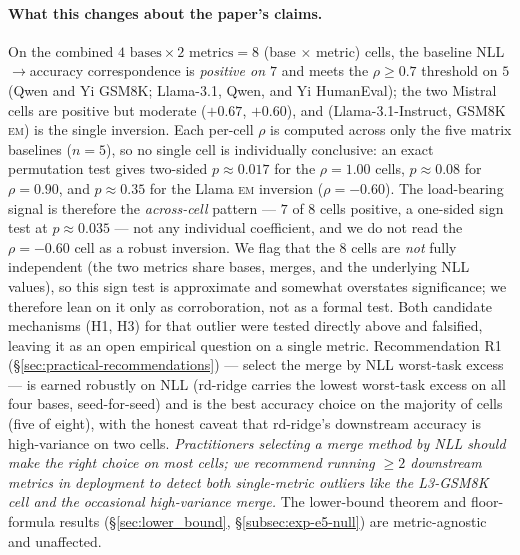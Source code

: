 \paragraph{What this changes about the paper's claims.} On the
combined $4 \text{ bases} \times 2 \text{ metrics} = 8$
(base $\times$ metric) cells, the baseline NLL$\to$accuracy
correspondence is \emph{positive on $7$} and meets the $\rho \geq 0.7$
threshold on $5$ (Qwen and Yi GSM8K; Llama-3.1, Qwen, and Yi
HumanEval); the two Mistral cells are positive but moderate ($+0.67$,
$+0.60$), and (Llama-3.1-Instruct, GSM8K \textsc{em}) is the single
inversion. Each per-cell $\rho$ is computed across only the five
matrix baselines ($n=5$), so no single cell is individually
conclusive: an exact permutation test gives two-sided $p \approx 0.017$
for the $\rho = 1.00$ cells, $p \approx 0.08$ for $\rho = 0.90$, and
$p \approx 0.35$ for the Llama \textsc{em} inversion ($\rho = -0.60$).
The load-bearing signal is therefore the \emph{across-cell} pattern ---
$7$ of $8$ cells positive, a one-sided sign test at $p \approx 0.035$
--- not any individual coefficient, and we do not read the
$\rho = -0.60$ cell as a robust inversion. We flag that the $8$ cells
are \emph{not} fully independent (the two metrics share bases, merges,
and the underlying NLL values), so this sign test is approximate and
somewhat overstates significance; we therefore lean on it only as
corroboration, not as a formal test. Both candidate mechanisms (H1, H3)
for that outlier were tested directly above and falsified, leaving it
as an open empirical question on a single metric. Recommendation R1
(\S\ref{sec:practical-recommendations}) --- select the merge by NLL
worst-task excess --- is earned robustly on NLL (rd-ridge carries the
lowest worst-task excess on all four bases, seed-for-seed) and is the
best accuracy choice on the majority of cells (five of eight), with the
honest caveat that rd-ridge's downstream accuracy is high-variance on
two cells.
\emph{Practitioners selecting a merge method by NLL should
make the right choice on most cells; we recommend running $\geq 2$
downstream metrics in deployment to detect both single-metric
outliers like the L3-GSM8K cell and the occasional high-variance
merge.} The lower-bound theorem and
floor-formula results (\S\ref{sec:lower_bound},
\S\ref{subsec:exp-e5-null}) are metric-agnostic and unaffected.

